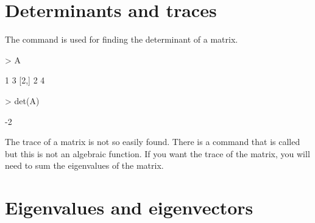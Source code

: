 \section{Determinants and traces}

The  command is used for finding the determinant of a matrix.
\begin{Schunk}
\begin{Sinput}
> A
\end{Sinput}
\begin{Soutput}
     [,1] [,2]
[1,]    1    3
[2,]    2    4
\end{Soutput}
\begin{Sinput}
> det(A)
\end{Sinput}
\begin{Soutput}
[1] -2
\end{Soutput}
\end{Schunk}

The trace of a matrix is not so easily found. There is a command that is called  but this is not an algebraic function. If you want the trace of the matrix, you will need to sum the eigenvalues of the matrix.

\section{Eigenvalues and eigenvectors}

